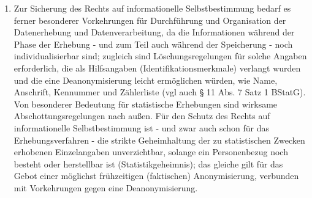 \begin{enumerate}[label=\arabic*,start=104]
            \item Zur Sicherung des Rechts auf informationelle Selbstbestimmung bedarf es ferner besonderer Vorkehrungen für Durchführung und Organisation der Datenerhebung und Datenverarbeitung, da die Informationen während der Phase der Erhebung - und zum Teil auch während der Speicherung - noch individualisierbar sind; zugleich sind Löschungsregelungen für solche Angaben erforderlich, die als Hilfsangaben (Identifikationsmerkmale) verlangt wurden und die eine Deanonymisierung leicht ermöglichen würden, wie Name, Anschrift, Kennummer und Zählerliste (vgl auch § 11 Abs. 7 Satz 1 BStatG). Von besonderer Bedeutung für statistische Erhebungen sind wirksame Abschottungsregelungen nach außen. Für den Schutz des Rechts auf informationelle Selbstbestimmung ist - und zwar auch schon für das Erhebungsverfahren - die strikte Geheimhaltung der zu statistischen Zwecken erhobenen Einzelangaben unverzichtbar, solange ein Personenbezug noch besteht oder herstellbar ist (Statistikgeheimnis); das gleiche gilt für das Gebot einer möglichst frühzeitigen (faktischen) Anonymisierung, verbunden mit Vorkehrungen gegen eine Deanonymisierung.

\end{enumerate}
